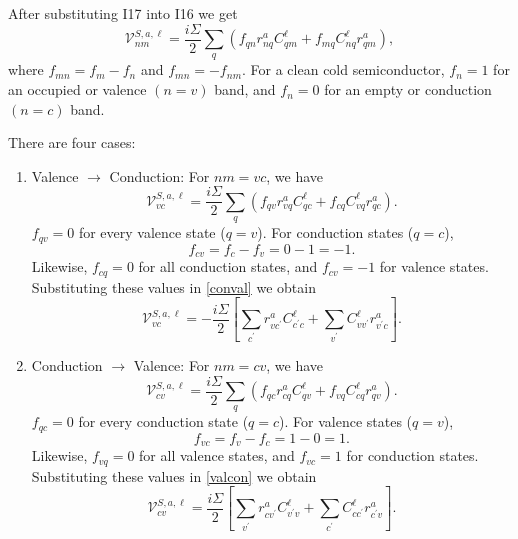 \documentclass{article}
\begin{document}
After substituting I17 into I16 we get
\begin{equation}
    \mathcal{V}^{S,a,\ell}_{nm} = 
    \frac{i\Sigma}{2}\sum_{q}\left(f_{qn}r^{a}_{nq}C^{\ell}_{qm}
                                 + f_{mq}C^{\ell}_{nq}r^{a}_{qm}\right),
    \end{equation}
where $f_{mn} = f_{m} - f_{n}$ and $f_{mn} = -f_{nm}$. For a clean cold 
semiconductor, $f_{n} = 1$ for an occupied or valence $(n = v)$ band, 
and $f_{n} = 0$ for an empty or conduction $(n = c)$ band.

There are four cases:
\begin{enumerate}
\item Valence $\rightarrow$ Conduction: 
  For $nm = vc$, we have
  \begin{equation}\label{conval}
    \mathcal{V}^{S,a,\ell}_{vc} = 
    \frac{i\Sigma}{2}
    \sum_{q}\left(f_{qv}r^{a}_{vq}C^{\ell}_{qc}
                + f_{cq}C^{\ell}_{vq}r^{a}_{qc}\right).
  \end{equation}
  $f_{qv} = 0$ for every valence state ($q = v$). 
  For conduction states ($q = c$),
  \begin{equation*}
      f_{cv} = f_{c} - f_{v} = 0 - 1 = -1.
  \end{equation*}
  Likewise, $f_{cq} = 0$ for all conduction states, and $f_{cv} = -1$ 
  for valence states. Substituting these values in \eqref{conval} we obtain
  \begin{equation}
      \mathcal{V}^{S,a,\ell}_{vc} = 
      -\frac{i\Sigma}{2}
      \left[\sum_{c^{\prime}}r^{a}_{vc^{\prime}}C^{\ell}_{c^{\prime}c}
          + \sum_{v^{\prime}}C^{\ell}_{vv^{\prime}}r^{a}_{v^{\prime}c}\right].
  \end{equation}

\item Conduction $\rightarrow$ Valence:
  For $nm = cv$, we have
  \begin{equation}\label{valcon}
    \mathcal{V}^{S,a,\ell}_{cv} = 
    \frac{i\Sigma}{2}
    \sum_{q}\left(f_{qc}r^{a}_{cq}C^{\ell}_{qv} 
                + f_{vq}C^{\ell}_{cq}r^{a}_{qv}\right).
  \end{equation}
  $f_{qc} = 0$ for every conduction state ($q = c$). 
  For valence states ($q = v$),
  \begin{equation*}
      f_{vc} = f_{v} - f_{c} = 1 - 0 = 1.
  \end{equation*}
  Likewise, $f_{vq} = 0$ for all valence states, and $f_{vc} = 1$ 
  for conduction states. Substituting these values in \eqref{valcon} we obtain
  \begin{equation}
      \mathcal{V}^{S,a,\ell}_{cv} = 
      \frac{i\Sigma}{2}
      \left[\sum_{v^{\prime}}r^{a}_{cv^{\prime}}C^{\ell}_{v^{\prime}v} 
          + \sum_{c^{\prime}}C^{\ell}_{cc^{\prime}}r^{a}_{c^{\prime}v}\right].
  \end{equation}


\end{enumerate}
\end{document}
